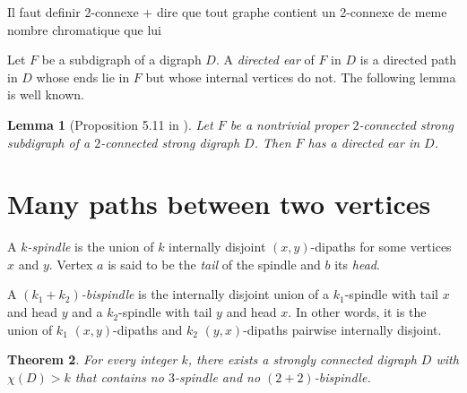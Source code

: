\documentclass[utf8,10pt]{article}
\theoremstyle{plain}
\newtheorem{theorem}{Theorem}
\newtheorem{lemma}[theorem]{Lemma}
\theoremstyle{definition}
\theoremstyle{remark}
\newcommand{\FH}[1]{{\color{red}{\bf Fred:} #1}}
\begin{document}
\FH{Il faut definir 2-connexe + dire que tout graphe contient un 2-connexe de meme nombre chromatique que lui}

Let $F$ be a subdigraph of a digraph $D$. A {\em directed
  ear} of $F$ in $D$ is a directed path in $D$ whose ends lie in $F$ but whose internal
vertices do not.   The following lemma is well known.

\begin{lemma}[Proposition 5.11 in \cite{BoMu08}] \label{lem:diear}
Let $F$ be a nontrivial proper $2$-connected strong subdigraph of a
$2$-connected strong digraph $D$. Then $F$ has a directed ear in $D$.
\end{lemma}


\section{Many paths between two vertices}

A {\it $k$-spindle} is the union of $k$ internally disjoint $(x,y)$-dipaths for some vertices $x$ and $y$. Vertex $a$ is said to be the {\it tail} of the spindle and $b$ its {\it head}.

A {\it $(k_1+k_2)$-bispindle} is the internally disjoint union of a $k_1$-spindle
with tail $x$ and head $y$ and a  $k_2$-spindle with tail $y$ and head $x$.
In other words, it is the union of $k_1$  $(x,y)$-dipaths and $k_2$ $(y,x)$-dipaths pairwise internally disjoint.


\begin{theorem}
For every integer $k$, there exists a strongly connected digraph $D$ with $\chi(D) >k$ that contains no $3$-spindle and no $(2+2)$-bispindle. 
\end{theorem}
\end{document}

